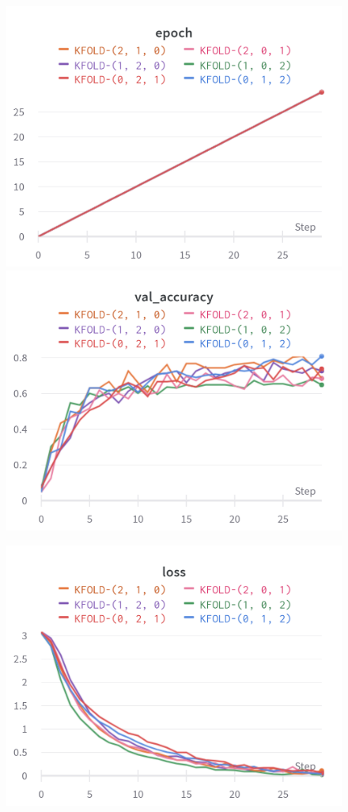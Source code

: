 \documentclass{article}
\begin{document}
\begin{figure}[!htb]
\includegraphics[width=\linewidth]{charts/Section-2-Panel-2-ai3xry1gl}
\caption{}
\endminipage\hfill
{}
\includegraphics[width=\linewidth]{charts/Section-2-Panel-3-fr749yccp}
\caption{}
\endminipage
\end{figure}

\begin{figure}[!htb]
\includegraphics[width=\linewidth]{charts/Section-2-Panel-4-2ibss91a8}
\caption{}
\endminipage
\end{figure}

\nocite{*}


\end{document}
